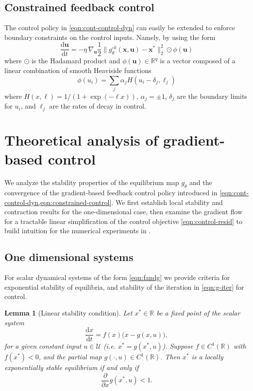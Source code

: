 \documentclass[11pt,twoside]{article}
\theoremstyle{plain}
\newtheorem{lemma}{Lemma}
\theoremstyle{definition}
\theoremstyle{remark}
\newcommand{\vect}[1]{\boldsymbol{#1}}
\newcommand{\R}{\mathbb{R}}
\begin{document}
\subsection{Constrained feedback control}

The control policy in \cref{eqn:cont-control-dyn} can easily be extended to enforce boundary constraints on the control inputs. Namely, by using the form
\begin{equation}
        \frac{\mathrm{d}\vect{u}}{\mathrm{d}t}
    = -\eta \, \nabla_{\vect{u}} 
    \frac{1}{2}
    \bigl\| g_\theta^{\circ k}(\vect{x}, \vect{u}) - \vect{x}^* \bigr\|_2^2 \odot \phi(\vect{u})
    \label{eqn:constrained-control}
\end{equation}
where \(\odot\) is the Hadamard product and \(\phi(\vect{u}) \in \R^q\) is a vector composed of a linear combination of smooth Heaviside functions 
\begin{equation}
    \phi(u_i) = \sum_j \alpha_j H(u_i - \delta_j, \ell_j)
\end{equation}
where \(H(x,\ell) = 1 / (1 + \exp{(-\ell x)})\), \(\alpha_j = \pm 1\), \(\delta_j\) are the boundary limits for \(u_i\), and \(\ell_j\) are the rates of decay in control.

\section{Theoretical analysis of gradient-based control}
\label{sec:theoretical-analysis}
We analyze the stability properties of the equilibrium map \(g_\theta\)
and the convergence of the gradient-based feedback control policy
introduced in \cref{eqn:cont-control-dyn,eqn:constrained-control}.
We first establish local stability and contraction results for the
one-dimensional case, then examine the gradient flow for a tractable
linear simplification of the control objective \cref{eqn:control-resid}
to build intuition for the numerical experiments in .

\subsection{One dimensional systems}

\label{sec:1d-system}

For scalar dynamical systems of the form \cref{eqn:fandg} we provide criteria for exponential stability of equilibria, and stability of the iteration in \cref{eqn:g-iter} for control.
\begin{lemma}[Linear stability condition]\label{lem:linear-stability}
Let \(x^* \in \R\) be a fixed point of the scalar system
\[
    \frac{\mathrm{d}x}{\mathrm{d}t} = f(x)\bigl(x - g(x,u)\bigr),
\]
for a given constant input \(u \in \mathcal{U}\) (i.e. \(x^* = g(x^*,u)\)). Suppose \(f\in C^1(\R)\)  with \(f(x^*)<0\), and 
the partial map \(g(\cdot, u) \in C^1(\R)\).  
Then \(x^*\) is a locally exponentially stable equilibrium if and only if
\[
    \frac{\partial}{\partial x} g(x^*,u) < 1.
\]
\end{lemma}
\end{document}
